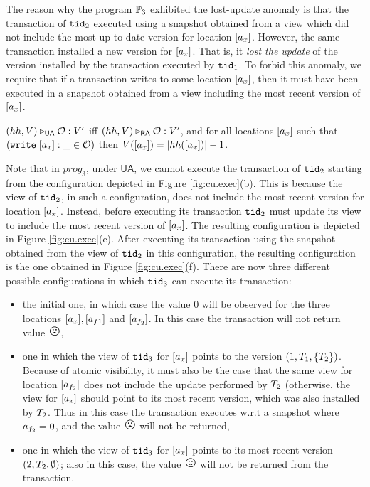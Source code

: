 The reason why the program $\mathbb{P}_3$ exhibited the lost-update anomaly is 
that the transaction of $\mathtt{tid}_2$ executed using a snapshot obtained from 
a view which did not include the most up-to-date version for location $[a_x]$. 
However, the same transaction installed a new version for $[a_x]$. That is, 
it \emph{lost the update} of the version installed by the transaction executed 
by $\mathtt{tid}_1$. To forbid this anomaly, we require that if a transaction 
writes to some location $[a_x]$, then it must have been executed 
in a snapshot obtained from a view including the most recent version of 
$[a_x]$.

\begin{definition}
$(hh, V) \triangleright_{\mathsf{UA}} \mathcal{O}: V'$ iff 
$(hh, V) \triangleright_{\mathsf{RA}} \mathcal{O}: V'$, and 
for all locations $[a_x]$ such that $({{\tt write}}\; [a_x] : \_ \in \mathcal{O})$ 
then $V([a_{x}]) = \lvert hh([a_x]) \rvert - 1$. 
\end{definition}

Note that in $prog_3$, under $\mathsf{UA}$, 
we cannot execute the transaction of $\mathtt{tid}_2$ starting from 
the configuration depicted in Figure \ref{fig:cu.exec}(b). This 
is because the view of $\mathtt{tid}_2$, in such a configuration, does 
not include the most recent version for location $[a_x]$. 
Instead, before executing its transaction $\mathtt{tid}_2$ must update 
its view to include the most recent version of $[a_x]$. The 
resulting configuration is depicted in Figure \ref{fig:cu.exec}(e). 
After executing its transaction using the snapshot obtained 
from the view of $\mathtt{tid}_2$ in this configuration, the resulting 
configuration is the one obtained in Figure \ref{fig:cu.exec}(f). 
There are now three different possible configurations in which 
$\mathtt{tid}_3$ can execute its transaction: 
\begin{itemize}
\item the initial one, in which case the value $0$ will be observed 
for the three locations $[a_x], [a_{f1}]$ and $[a_{f_2}]$. 
In this case the transaction will not return value ${\Large \frownie{}}$, 
\item one in which the view of $\mathtt{tid}_3$ for $[a_x]$ points to the 
version $(1, T_1, \{T_2\})$. Because of atomic visibility, 
it must also be the case that the same view for location $[a_{f_2}]$ 
does not include the update performed by $T_2$ (otherwise, 
the view for $[a_x]$ should point to its most recent version, which 
was also installed by $T_2$. Thus in this case the transaction executes 
w.r.t a snapshot where $a_{f_2} = 0$, and the value ${\Large \frownie{}}$ 
will not be returned, 
\item one in which the view of $\mathtt{tid}_3$ for $[a_x]$ points to 
its most recent version $(2, T_2, \emptyset)$; also in this case, 
the value ${\Large \frownie{}}$ will not be returned from the transaction.
\end{itemize}


